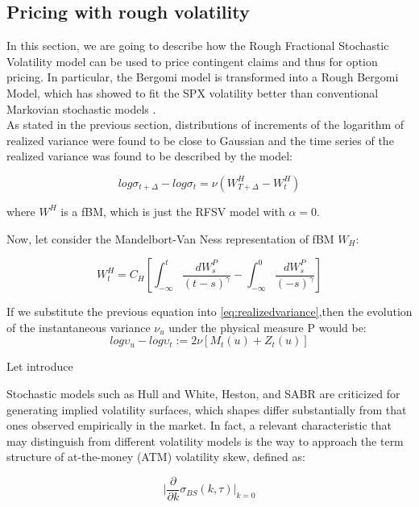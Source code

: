 \documentclass[12pt,oneside]{article}
\begin{document}
\subsection{Pricing with rough volatility}

In this section, we are going to describe how the Rough Fractional Stochastic Volatility model can be used to price contingent claims and thus for option pricing. In particular, the Bergomi model is transformed into a Rough Bergomi Model, which has showed to fit the SPX volatility better than conventional Markovian stochastic models \cite{Bayer2016pricing}. 
\\

As stated in the previous section,  distributions of increments of the logarithm of realized variance were found to be close to Gaussian and the time series of the realized variance was found to be described by the model:

\begin{equation}
\label{eq:realizedvariance}
    log\sigma_{t+\Delta} - log\sigma_{t} = \nu (W_{T+\Delta}^{H} - W_{t}^{H})
\end{equation}

where $W^{H}$ is a fBM, which is just the RFSV model with $\alpha = 0$.

Now, let consider the Mandelbort-Van Ness representation of fBM $W_{H}$:

$$W_{t}^{H} = C_{H} [\int_{-\infty}^{t} \frac{dW_{s}^{P}}{(t-s)^{\gamma}} - \int_{-\infty}^{0} \frac{dW_{s}^{P}}{(-s)^{\gamma}}]$$


If we substitute the previous equation into \ref{eq:realizedvariance},then the evolution of the instantaneous variance $\nu_{u}$ under the physical measure P would be:
\begin{equation}
\label{eq:realizedvariance}
    log\upsilon_{u} - log\upsilon_{t} := 2  \nu [M_{t}(u) + Z_{t}(u)]
\end{equation}

Let introduce 



Stochastic models such as Hull and White, Heston, and SABR are criticized for generating implied volatility surfaces, which shapes differ substantially from that ones observed empirically in the market. In fact, a relevant characteristic that may distinguish from different volatility models is the way to approach the term structure of at-the-money (ATM) volatility skew, defined as:

\begin{equation}
    \lvert \frac{\partial}{\partial k} \sigma_{BS}(k,\tau) \rvert_{k = 0}
\end{equation}
\end{document}
